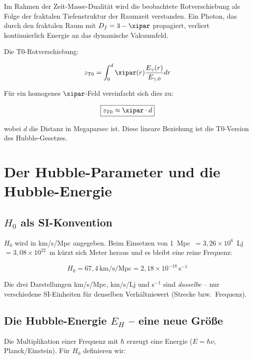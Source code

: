 Im Rahmen der Zeit-Masse-Dualität wird die beobachtete Rotverschiebung 
als Folge der fraktalen Tiefenstruktur der Raumzeit verstanden. Ein Photon, 
das durch den fraktalen Raum mit $D_f = 3 - \xipar$ propagiert, verliert 
kontinuierlich Energie an das dynamische Vakuumfeld.

Die T0-Rotverschiebung:

\begin{equation}
z_{\text{T0}} = \int_0^d \xipar(r) \frac{E_\gamma(r)}{E_{\gamma,0}} dr
\end{equation}

Für ein homogenes $\xipar$-Feld vereinfacht sich dies zu:

\begin{equation}
\boxed{z_{\text{T0}} \approx \xipar \cdot d}
\label{eq:z_T0_linear}
\end{equation}

wobei $d$ die Distanz in Megaparsec ist. Diese lineare Beziehung ist die 
T0-Version des Hubble-Gesetzes.

\section{Der Hubble-Parameter und die Hubble-Energie}

\subsection{$H_0$ als SI-Konvention}

$H_0$ wird in km/s/Mpc angegeben. Beim Einsetzen von 
1~Mpc~$= 3{,}26 \times 10^6$~Lj~$= 3{,}08 \times 10^{22}$~m 
kürzt sich Meter heraus und es bleibt eine reine Frequenz:

\begin{equation}
H_0 = 67{,}4\,\text{km/s/Mpc} = 2{,}18 \times 10^{-18}\,\text{s}^{-1}
\end{equation}

Die drei Darstellungen km/s/Mpc, km/s/Lj und s$^{-1}$ sind 
\emph{dasselbe} -- nur verschiedene SI-Einheiten für denselben 
Verhältniswert (Strecke bzw.\ Frequenz).

\subsection{Die Hubble-Energie $E_H$ -- eine neue Größe}

Die Multiplikation einer Frequenz mit $\hbar$ erzeugt eine Energie 
($E = \hbar\nu$, Planck/Einstein). Für $H_0$ definieren wir:

